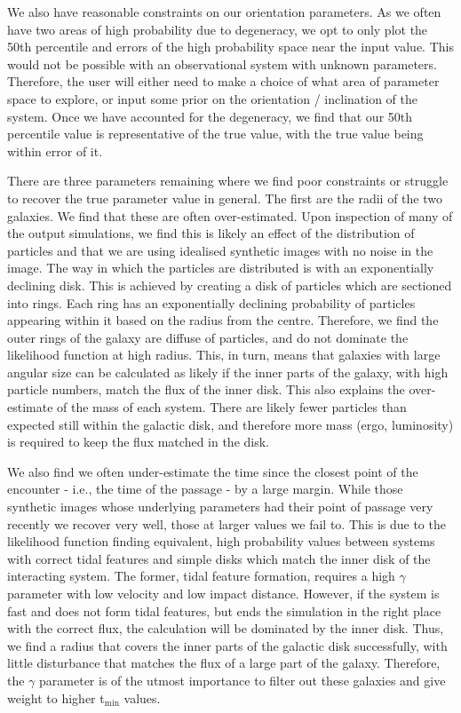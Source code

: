 We also have reasonable constraints on our orientation parameters. As we often have two areas of high probability due to degeneracy, we opt to only plot the 50th percentile and errors of the high probability space near the input value. This would not be possible with an observational system with unknown parameters. Therefore, the user will either need to make a choice of what area of parameter space to explore, or input some prior on the orientation / inclination of the system. Once we have accounted for the degeneracy, we find that our 50th percentile value is representative of the true value, with the true value being within error of it. 

There are three parameters remaining where we find poor constraints or struggle to recover the true parameter value in general. The first are the radii of the two galaxies. We find that these are often over-estimated. Upon inspection of many of the output simulations, we find this is likely an effect of the distribution of particles and that we are using idealised synthetic images with no noise in the image. The way in which the particles are distributed is with an exponentially declining disk. This is achieved by creating a disk of particles which are sectioned into rings. Each ring has an exponentially declining probability of particles appearing within it based on the radius from the centre. Therefore, we find the outer rings of the galaxy are diffuse of particles, and do not dominate the likelihood function at high radius. This, in turn, means that galaxies with large angular size can be calculated as likely if the inner parts of the galaxy, with high particle numbers, match the flux of the inner disk. This also explains the over-estimate of the mass of each system. There are likely fewer particles than expected still within the galactic disk, and therefore more mass (ergo, luminosity) is required to keep the flux matched in the disk.

We also find we often under-estimate the time since the closest point of the encounter - i.e., the time of the passage - by a large margin. While those synthetic images whose underlying parameters had their point of passage very recently we recover very well, those at larger values we fail to. This is due to the likelihood function finding equivalent, high probability values between systems with correct tidal features and simple disks which match the inner disk of the interacting system. The former, tidal feature formation, requires a high $\gamma$ parameter with low velocity and low impact distance. However, if the system is fast and does not form tidal features, but ends the simulation in the right place with the correct flux, the calculation will be dominated by the inner disk. Thus, we find a radius that covers the inner parts of the galactic disk successfully, with little disturbance that matches the flux of a large part of the galaxy. Therefore, the $\gamma$ parameter is of the utmost importance to filter out these galaxies and give weight to higher t$_{\mathrm{min}}$ values.

